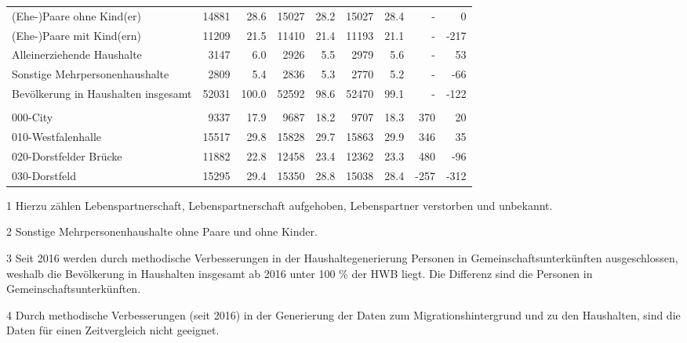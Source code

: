 \documentclass[
  a4paper,
  twoside]{article}
\begin{document}
\begin{table}[!h]
{\begin{threeparttable}
\begin{tabular}[t]{lrrrrrrrr}
\hspace{1em}\hspace{1em}(Ehe-)Paare ohne Kind(er) & 14881 & 28.6 & 15027 & 28.2 & 15027 & 28.4 & - & 0\\
\hspace{1em}\hspace{1em}(Ehe-)Paare mit Kind(ern) & 11209 & 21.5 & 11410 & 21.4 & 11193 & 21.1 & - & -217\\
\hspace{1em}\hspace{1em}Alleinerziehende Haushalte & 3147 & 6.0 & 2926 & 5.5 & 2979 & 5.6 & - & 53\\
\hspace{1em}\hspace{1em}Sonstige Mehrpersonenhaushalte & 2809 & 5.4 & 2836 & 5.3 & 2770 & 5.2 & - & -66\\
\hspace{1em}\hspace{1em}Bevölkerung in Haushalten insgesamt & 52031 & 100.0 & 52592 & 98.6 & 52470 & 99.1 & - & -122\\
\addlinespace[0.3em]
\multicolumn{9}{l}{\textcolor[HTML]{044891}{Bevölkerung nach Statistischen Bezirken}}\\
\hspace{1em}\hspace{1em}000-City & 9337 & 17.9 & 9687 & 18.2 & 9707 & 18.3 & 370 & 20\\
\hspace{1em}\hspace{1em}010-Westfalenhalle & 15517 & 29.8 & 15828 & 29.7 & 15863 & 29.9 & 346 & 35\\
\hspace{1em}\hspace{1em}020-Dorstfelder Brücke & 11882 & 22.8 & 12458 & 23.4 & 12362 & 23.3 & 480 & -96\\
\hspace{1em}\hspace{1em}030-Dorstfeld & 15295 & 29.4 & 15350 & 28.8 & 15038 & 28.4 & -257 & -312\\
\bottomrule
\end{tabular}
\begin{tablenotes}
\small
\item[1] Hierzu zählen Lebenspartnerschaft, Lebenspartnerschaft aufgehoben, Lebenspartner verstorben und unbekannt.
\item[2] Sonstige Mehrpersonenhaushalte ohne Paare und ohne Kinder.
\item[3] Seit 2016 werden durch methodische Verbesserungen in der Haushaltegenerierung Personen in Gemeinschaftsunterkünften ausgeschlossen, weshalb die Bevölkerung in Haushalten insgesamt ab 2016 unter 100 \% der HWB liegt. Die Differenz sind die Personen in Gemeinschaftsunterkünften.
\item[4] Durch methodische Verbesserungen (seit 2016) in der Generierung der Daten zum Migrationshintergrund und zu den Haushalten, sind die Daten für einen Zeitvergleich nicht geeignet.
\end{tablenotes}
\end{threeparttable}}
\end{table}
\end{document}
